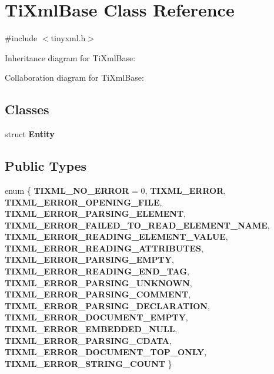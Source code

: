 \hypertarget{class_ti_xml_base}{
\section{\-Ti\-Xml\-Base \-Class \-Reference}
\label{class_ti_xml_base}
}


{\ttfamily \#include $<$tinyxml.\-h$>$}



\-Inheritance diagram for \-Ti\-Xml\-Base\-:


\-Collaboration diagram for \-Ti\-Xml\-Base\-:
\subsection*{\-Classes}
\begin{DoxyCompactItemize}
\item 
struct {\bfseries \-Entity}
\end{DoxyCompactItemize}
\subsection*{\-Public \-Types}
\begin{DoxyCompactItemize}
\item 
enum \{ \*
{\bfseries \-T\-I\-X\-M\-L\-\_\-\-N\-O\-\_\-\-E\-R\-R\-O\-R} =  0, 
{\bfseries \-T\-I\-X\-M\-L\-\_\-\-E\-R\-R\-O\-R}, 
{\bfseries \-T\-I\-X\-M\-L\-\_\-\-E\-R\-R\-O\-R\-\_\-\-O\-P\-E\-N\-I\-N\-G\-\_\-\-F\-I\-L\-E}, 
{\bfseries \-T\-I\-X\-M\-L\-\_\-\-E\-R\-R\-O\-R\-\_\-\-P\-A\-R\-S\-I\-N\-G\-\_\-\-E\-L\-E\-M\-E\-N\-T}, 
\*
{\bfseries \-T\-I\-X\-M\-L\-\_\-\-E\-R\-R\-O\-R\-\_\-\-F\-A\-I\-L\-E\-D\-\_\-\-T\-O\-\_\-\-R\-E\-A\-D\-\_\-\-E\-L\-E\-M\-E\-N\-T\-\_\-\-N\-A\-M\-E}, 
{\bfseries \-T\-I\-X\-M\-L\-\_\-\-E\-R\-R\-O\-R\-\_\-\-R\-E\-A\-D\-I\-N\-G\-\_\-\-E\-L\-E\-M\-E\-N\-T\-\_\-\-V\-A\-L\-U\-E}, 
{\bfseries \-T\-I\-X\-M\-L\-\_\-\-E\-R\-R\-O\-R\-\_\-\-R\-E\-A\-D\-I\-N\-G\-\_\-\-A\-T\-T\-R\-I\-B\-U\-T\-E\-S}, 
{\bfseries \-T\-I\-X\-M\-L\-\_\-\-E\-R\-R\-O\-R\-\_\-\-P\-A\-R\-S\-I\-N\-G\-\_\-\-E\-M\-P\-T\-Y}, 
\*
{\bfseries \-T\-I\-X\-M\-L\-\_\-\-E\-R\-R\-O\-R\-\_\-\-R\-E\-A\-D\-I\-N\-G\-\_\-\-E\-N\-D\-\_\-\-T\-A\-G}, 
{\bfseries \-T\-I\-X\-M\-L\-\_\-\-E\-R\-R\-O\-R\-\_\-\-P\-A\-R\-S\-I\-N\-G\-\_\-\-U\-N\-K\-N\-O\-W\-N}, 
{\bfseries \-T\-I\-X\-M\-L\-\_\-\-E\-R\-R\-O\-R\-\_\-\-P\-A\-R\-S\-I\-N\-G\-\_\-\-C\-O\-M\-M\-E\-N\-T}, 
{\bfseries \-T\-I\-X\-M\-L\-\_\-\-E\-R\-R\-O\-R\-\_\-\-P\-A\-R\-S\-I\-N\-G\-\_\-\-D\-E\-C\-L\-A\-R\-A\-T\-I\-O\-N}, 
\*
{\bfseries \-T\-I\-X\-M\-L\-\_\-\-E\-R\-R\-O\-R\-\_\-\-D\-O\-C\-U\-M\-E\-N\-T\-\_\-\-E\-M\-P\-T\-Y}, 
{\bfseries \-T\-I\-X\-M\-L\-\_\-\-E\-R\-R\-O\-R\-\_\-\-E\-M\-B\-E\-D\-D\-E\-D\-\_\-\-N\-U\-L\-L}, 
{\bfseries \-T\-I\-X\-M\-L\-\_\-\-E\-R\-R\-O\-R\-\_\-\-P\-A\-R\-S\-I\-N\-G\-\_\-\-C\-D\-A\-T\-A}, 
{\bfseries \-T\-I\-X\-M\-L\-\_\-\-E\-R\-R\-O\-R\-\_\-\-D\-O\-C\-U\-M\-E\-N\-T\-\_\-\-T\-O\-P\-\_\-\-O\-N\-L\-Y}, 
\*
{\bfseries \-T\-I\-X\-M\-L\-\_\-\-E\-R\-R\-O\-R\-\_\-\-S\-T\-R\-I\-N\-G\-\_\-\-C\-O\-U\-N\-T}
 \}
\end{DoxyCompactItemize}
